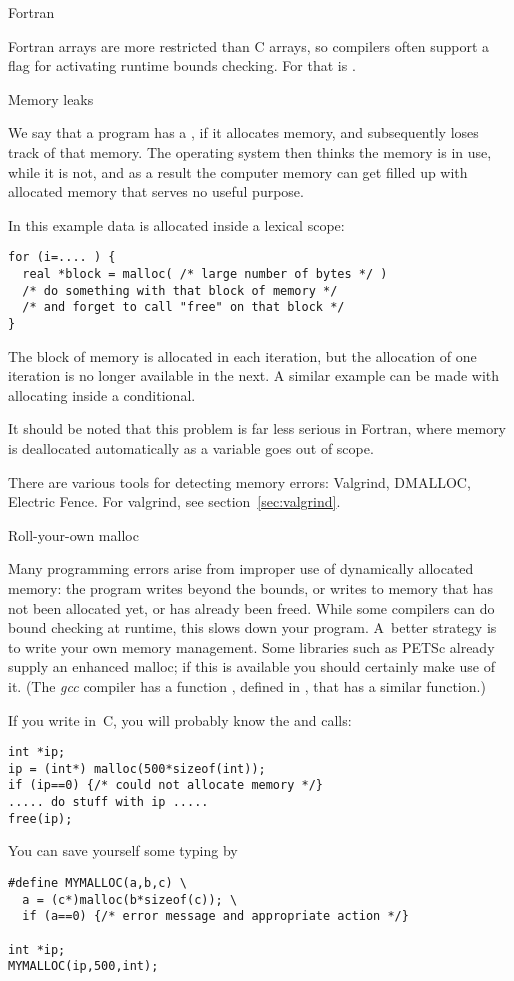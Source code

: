  {Fortran}

Fortran arrays are more restricted than C arrays, so compilers
often support a flag for activating runtime bounds checking.
For  that is .

 {Memory leaks}

We say that a program has a , if it allocates
memory, and subsequently loses track of that memory. The operating
system then thinks the memory is in use, while it is not, and as a
result the computer memory can get filled up with allocated memory
that serves no useful purpose.

In this example data is allocated inside a lexical scope:
\begin{verbatim}
for (i=.... ) {
  real *block = malloc( /* large number of bytes */ )
  /* do something with that block of memory */
  /* and forget to call "free" on that block */
}
\end{verbatim}
The block of memory is allocated in each iteration, but the allocation
of one iteration is no longer available in the next. A similar example
can be made with allocating inside a conditional. 

It should be noted
that this problem is far less serious in Fortran, where memory is
deallocated automatically as a variable goes out of scope.

There are various tools for detecting memory errors: Valgrind,
DMALLOC, Electric Fence. For valgrind, see section~\ref{sec:valgrind}.

 {Roll-your-own malloc}

Many programming errors arise from improper use of dynamically
allocated memory: the program writes beyond the bounds, or writes to
memory that has not been allocated yet, or has already been
freed. While some compilers can do bound checking at runtime, this
slows down your program. A~better strategy is to write your own memory
management. Some libraries such as PETSc already supply an enhanced
malloc; if this is available you should certainly make use of
it. (The \emph{gcc} compiler has a
function , defined in , that has a
similar function.)

If you write in~C, you will probably know the  and  calls:
\begin{verbatim}
int *ip;
ip = (int*) malloc(500*sizeof(int));
if (ip==0) {/* could not allocate memory */}
..... do stuff with ip .....
free(ip);
\end{verbatim}
You can save yourself some typing by
\begin{verbatim}
#define MYMALLOC(a,b,c) \
  a = (c*)malloc(b*sizeof(c)); \
  if (a==0) {/* error message and appropriate action */}

int *ip;
MYMALLOC(ip,500,int);
\end{verbatim}

